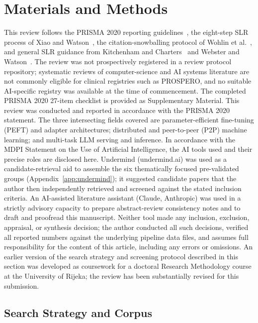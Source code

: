 \section{Materials and Methods}
\label{sec:methodology}

This review follows the PRISMA 2020 reporting guidelines~\cite{Page2021}, the
eight-step SLR process of Xiao and Watson~\cite{XiaoWatson2019}, the
citation-snowballing protocol of Wohlin et al.~\cite{Wohlin2014}, and general
SLR guidance from Kitchenham and Charters~\cite{KitchenhamCharters2007} and
Webster and Watson~\cite{Webster2002}. The review was
not prospectively registered in a review protocol repository; systematic
reviews of computer-science and AI systems literature are not commonly eligible
for clinical registries such as PROSPERO, and no suitable AI-specific registry
was available at the time of commencement. The completed
PRISMA 2020 27-item checklist is provided as Supplementary Material. This
review was conducted and reported in accordance with the PRISMA 2020 statement.
The three intersecting fields covered are parameter-efficient fine-tuning (PEFT) and
adapter architectures; distributed and peer-to-peer (P2P) machine learning;
and multi-task LLM serving and inference. In accordance with the MDPI
Statement on the Use of Artificial Intelligence, the AI tools used and their
precise roles are disclosed here. Undermind (undermind.ai) was used as a
candidate-retrieval aid to assemble the six thematically focused pre-validated
groups (Appendix~\ref{app:undermind}); it suggested candidate papers that the
author then independently retrieved and screened against the stated inclusion
criteria. An AI-assisted literature assistant (Claude, Anthropic) was used in a
strictly advisory capacity to prepare abstract-review consistency notes and to
draft and proofread this manuscript. Neither tool made any inclusion,
exclusion, appraisal, or synthesis decision; the author conducted all such
decisions, verified all reported numbers against the underlying pipeline data
files, and assumes full responsibility for the content of this article,
including any errors or omissions. An earlier version of the search strategy
and screening protocol described in this section was developed as coursework
for a doctoral Research Methodology course at the University of Rijeka; the
review has been substantially revised for this submission.

\subsection{Search Strategy and Corpus}
\label{sec:methodology:search}

